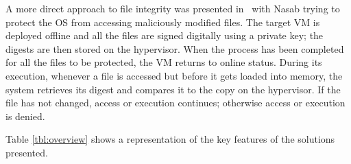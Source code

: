 \par A more direct approach to file integrity was presented in~\cite{nasab2012security} with Nasab trying to protect the \ac{OS} from accessing maliciously modified files. The target \ac{VM} is deployed offline and all the files are signed digitally using a private key; the digests are then stored on the hypervisor. When the process has been completed for all the files to be protected, the \ac{VM} returns to online status. During its execution, whenever a file is accessed but before it gets loaded into memory, the system retrieves its digest and compares it to the copy on the hypervisor. If the file has not changed, access or execution continues; otherwise access or execution is denied.

\par Table \ref{tbl:overview} shows a representation of the key features of the solutions presented.

